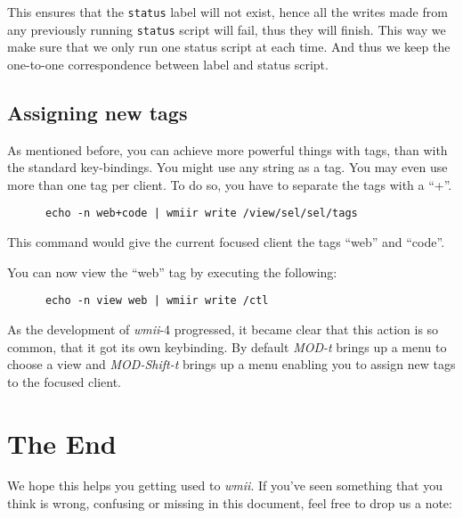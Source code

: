 \documentclass[12pt,a4paper]{article} %
\newcommand{\wmii}{\emph{wmii}}
\begin{document}
    This ensures that the \verb+status+ label will not exist, hence all
    the writes made from any previously running \verb+status+ script
    will fail, thus they will finish. This way we make sure that
    we only run one status script at each time.  And thus we keep the
    one-to-one correspondence between label and status script.
    
    \subsection{Assigning new tags}
    
    As mentioned before, you can achieve more powerful things with tags, than
    with the standard key-bindings. You might use any string as a tag. You may
    even use more than one tag per client. To do so, you have to separate the
    tags with a ``+''.

    \begin{verbatim}
      echo -n web+code | wmiir write /view/sel/sel/tags
    \end{verbatim}

    This command would give the current focused client the tags
    ``web'' and ``code''.
    
    You can now view the ``web'' tag by executing the following:

    \begin{verbatim}
      echo -n view web | wmiir write /ctl
    \end{verbatim}

    As the development of \wmii-4 progressed, it became clear that this
    action is so common, that it got its own keybinding. By default
    \emph{MOD-t} brings up a menu to choose a view and
    \emph{MOD-Shift-t} brings up a menu enabling you to assign new
    tags to the focused client.


    \section{The End}
    \label{sec:end}
    
    We hope this helps you getting used to \wmii.
    If you've seen something that you think is wrong, confusing or missing in
    this document, feel free to drop us a note:
\end{document}
